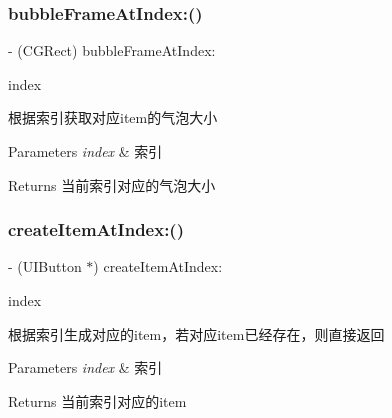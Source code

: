 \subsubsection{\texorpdfstring{bubble\+Frame\+At\+Index\+:()}{bubbleFrameAtIndex:()}\hspace{0.1cm}{\footnotesize\ttfamily [3/3]}}
{\footnotesize\ttfamily -\/ (C\+G\+Rect) bubble\+Frame\+At\+Index\+: \begin{DoxyParamCaption}\item[{(N\+S\+U\+Integer)}]{index }\end{DoxyParamCaption}}

根据索引获取对应item的气泡大小


\begin{DoxyParams}{Parameters}
{\em index} & 索引\\
\hline
\end{DoxyParams}
\begin{DoxyReturn}{Returns}
当前索引对应的气泡大小 
\end{DoxyReturn}
\mbox{\label{interface_v_t_menu_bar_ae78207b0eeb1d9e9597a297db6199403}} 
\subsubsection{\texorpdfstring{create\+Item\+At\+Index\+:()}{createItemAtIndex:()}\hspace{0.1cm}{\footnotesize\ttfamily [1/3]}}
{\footnotesize\ttfamily -\/ (U\+I\+Button $\ast$) create\+Item\+At\+Index\+: \begin{DoxyParamCaption}\item[{(N\+S\+U\+Integer)}]{index }\end{DoxyParamCaption}}

根据索引生成对应的item，若对应item已经存在，则直接返回


\begin{DoxyParams}{Parameters}
{\em index} & 索引\\
\hline
\end{DoxyParams}
\begin{DoxyReturn}{Returns}
当前索引对应的item 
\end{DoxyReturn}
\mbox{\label{interface_v_t_menu_bar_ae78207b0eeb1d9e9597a297db6199403}} 
